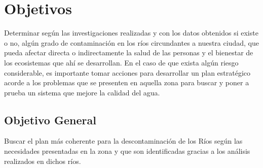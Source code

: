 \section{Objetivos}
Determinar según las investigaciones realizadas y con los datos obtenidos si existe o no, algún grado de contaminación en los ríos circundantes a nuestra ciudad, que pueda afectar directa o indirectamente la salud de las personas y el bienestar de los ecosistemas que ahí se desarrollan. En el caso de que exista algún riesgo considerable, es importante tomar acciones para desarrollar un plan estratégico acorde a los problemas que se presenten en aquella zona para buscar y poner a prueba un sistema que mejore la calidad del agua.
\subsection{Objetivo General}
Buscar el plan más coherente para la descontaminación de los Ríos según las necesidades presentadas en la zona y que son identificadas gracias a los análisis realizados en dichos ríos.
